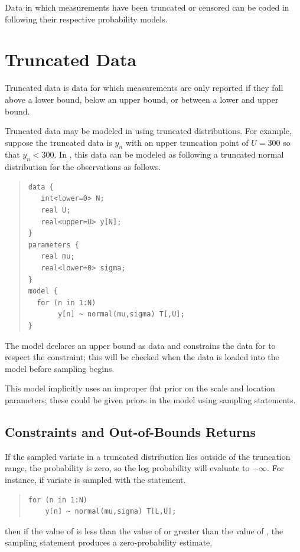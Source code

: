 \noindent
Data in which measurements have been truncated or censored can be
coded in \Stan following their respective probability models.

\section{Truncated Data}

Truncated data is data for which measurements are only reported if
they fall above a lower bound, below an upper bound, or between a
lower and upper bound.  

Truncated data may be modeled in \Stan using truncated distributions.
For example, suppose the truncated data is $y_n$ with an upper
truncation point of $U = 300$ so that $y_n < 300$.  In \Stan, this
data can be modeled as following a truncated normal distribution for
the observations as follows. 
%
\begin{quote}
\begin{Verbatim} 
data {
   int<lower=0> N;
   real U;
   real<upper=U> y[N];
} 
parameters {
   real mu;
   real<lower=0> sigma;
} 
model {
  for (n in 1:N)
       y[n] ~ normal(mu,sigma) T[,U];
}
\end{Verbatim}
\end{quote}
% 
The model declares an upper bound  as data and constrains
the data for  to respect the constraint;  this will be checked
when the data is loaded into the model before sampling begins.

This model implicitly uses an improper flat prior on the scale and
location parameters; these could be given priors in the model using
sampling statements.

\subsection{Constraints and Out-of-Bounds Returns}\label{truncation-constraints.section}

If the sampled variate in a truncated distribution lies outside of
the truncation range, the probability is zero, so the log probability
will evaluate to $-\infty$.  For instance, if variate  is
sampled with the statement.
%
\begin{quote}
\begin{Verbatim}
for (n in 1:N) 
    y[n] ~ normal(mu,sigma) T[L,U];
\end{Verbatim}
\end{quote}
%
then if the value of  is less than the value of 
or greater than the value of , the sampling statement produces
a zero-probability estimate.


